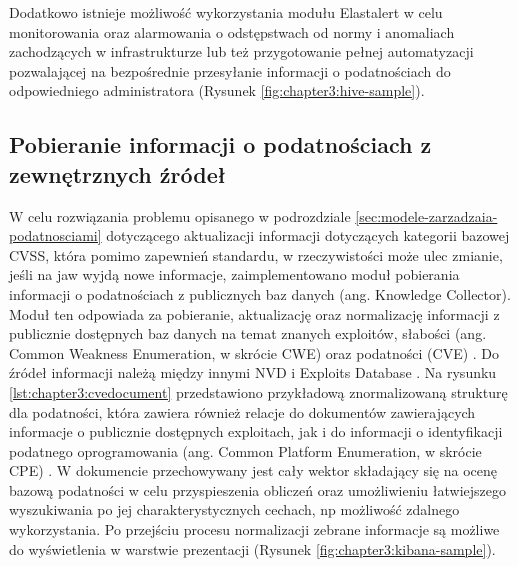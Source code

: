 \bigbreak
Dodatkowo istnieje możliwość wykorzystania modułu Elastalert \cite{elastalert} w celu monitorowania oraz alarmowania o odstępstwach od normy i anomaliach zachodzących w infrastrukturze lub też przygotowanie pełnej automatyzacji pozwalającej na bezpośrednie przesyłanie informacji o podatnościach do odpowiedniego administratora (Rysunek \ref{fig:chapter3:hive-sample}).


\subsection{Pobieranie informacji o podatnościach z zewnętrznych źródeł}
W celu rozwiązania problemu opisanego w podrozdziale \ref{sec:modele-zarzadzaia-podatnosciami} dotyczącego aktualizacji informacji dotyczących kategorii bazowej CVSS, która pomimo zapewnień standardu, w rzeczywistości może ulec zmianie, jeśli na jaw wyjdą nowe informacje, zaimplementowano moduł pobierania informacji o podatnościach z publicznych baz danych (ang. Knowledge Collector). Moduł ten odpowiada za pobieranie, aktualizację oraz normalizację informacji z publicznie dostępnych baz danych na temat znanych exploitów, słabości (ang. Common Weakness Enumeration, w skrócie CWE) \cite{martin2007common} oraz podatności (CVE) \cite{cvsspecification}. Do źródeł informacji należą między innymi NVD \cite{booth2013national} i Exploits Database \cite{exploitexploits}. Na rysunku \ref{lst:chapter3:cvedocument} przedstawiono przykładową znormalizowaną strukturę dla podatności, która zawiera również relacje do dokumentów zawierających informacje o publicznie dostępnych exploitach, jak i do informacji o identyfikacji podatnego oprogramowania (ang. Common Platform Enumeration, w skrócie CPE) \cite{buttner2009common}. W dokumencie przechowywany jest cały wektor składający się na ocenę bazową podatności w celu przyspieszenia obliczeń oraz umożliwieniu łatwiejszego wyszukiwania po jej charakterystycznych cechach, np możliwość zdalnego wykorzystania. Po przejściu procesu normalizacji zebrane informacje są możliwe do wyświetlenia w warstwie prezentacji (Rysunek \ref{fig:chapter3:kibana-sample}).

